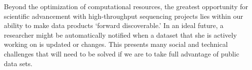 \documentclass[12pt]{article}
\begin{document}
Beyond the optimization of computational resources, the greatest opportunity for scientific advancement with high-throughput sequencing projects lies within our ability to make data products `forward discoverable.' In an ideal future, a researcher might be automatically notified when a dataset that she is actively working on is updated or changes. This presents many social and technical challenges that will need to be solved if we are to take full advantage of public data sets.




\newpage


\end{document}
